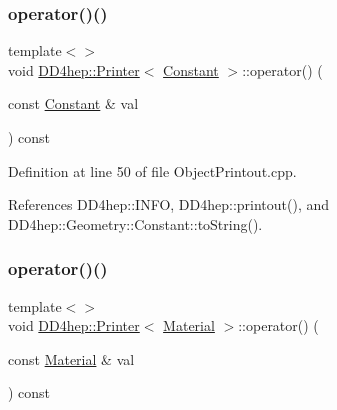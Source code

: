 \hypertarget{struct_d_d4hep_1_1_printer_ab21c1ad2868521a1cbd2e3f301b0db90}{}\label{struct_d_d4hep_1_1_printer_ab21c1ad2868521a1cbd2e3f301b0db90} 
\subsubsection{\texorpdfstring{operator()()}{operator()()}\hspace{0.1cm}{\footnotesize\ttfamily [3/12]}}
{\footnotesize\ttfamily template$<$$>$ \\
void \hyperlink{struct_d_d4hep_1_1_printer}{D\+D4hep\+::\+Printer}$<$ \hyperlink{class_d_d4hep_1_1_geometry_1_1_constant}{Constant} $>$\+::operator() (\begin{DoxyParamCaption}\item[{const \hyperlink{class_d_d4hep_1_1_geometry_1_1_constant}{Constant} \&}]{val }\end{DoxyParamCaption}) const}



Definition at line 50 of file Object\+Printout.\+cpp.



References D\+D4hep\+::\+I\+N\+FO, D\+D4hep\+::printout(), and D\+D4hep\+::\+Geometry\+::\+Constant\+::to\+String().

\hypertarget{struct_d_d4hep_1_1_printer_a7bd57999b2889ea04620f0619bfda983}{}\label{struct_d_d4hep_1_1_printer_a7bd57999b2889ea04620f0619bfda983} 
\subsubsection{\texorpdfstring{operator()()}{operator()()}\hspace{0.1cm}{\footnotesize\ttfamily [4/12]}}
{\footnotesize\ttfamily template$<$$>$ \\
void \hyperlink{struct_d_d4hep_1_1_printer}{D\+D4hep\+::\+Printer}$<$ \hyperlink{class_d_d4hep_1_1_geometry_1_1_material}{Material} $>$\+::operator() (\begin{DoxyParamCaption}\item[{const \hyperlink{class_d_d4hep_1_1_geometry_1_1_material}{Material} \&}]{val }\end{DoxyParamCaption}) const}



